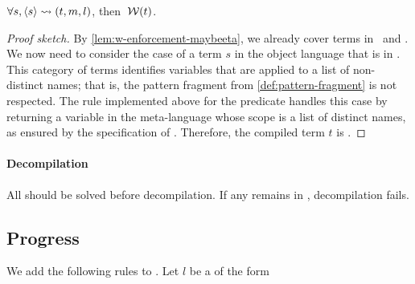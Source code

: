 
\begin{lemma}\label{lem:w-enforcement-maybellam}
  $\forall s, \langle s \rangle\rightsquigarrow(t,m,l)$, then $\:\mathcal{W}(t)$.
\end{lemma}

\begin{proof}[Proof sketch]
  By \cref{lem:w-enforcement-maybeeta}, we already cover terms in
  \maybebeta\ and \maybeeta. We now need to consider the case of a term
  $s$ in the object language that is in \notllambda. This category
  of terms identifies variables that are applied to a list of
  non-distinct names; that is, the pattern fragment from
  \cref{def:pattern-fragment} is not respected.
  The rule implemented above for the predicate  handles this
  case by returning a variable in the meta-language whose scope is a
  list of distinct names, as ensured by the specification of
  . Therefore, the compiled term $t$ is \wellb.
\end{proof}

\paragraph*{Decompilation}
All \linkbeta should be solved before decompilation.
If any \linkbeta remains in \linkStore, decompilation fails.

\subsection{Progress}


We add the following rules to .
Let $l$ be a \linkbeta of the form 

